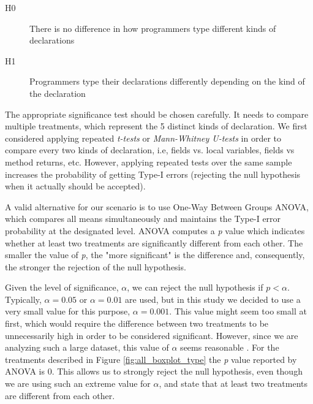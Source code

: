 \documentclass[msc]{ppgccufmg}
\begin{document}
\begin{description}
\item[H0] There is no difference in how programmers type different kinds of declarations
\item[H1] Programmers type their declarations differently depending on the kind of the declaration
\end{description}

The appropriate significance test should be chosen carefully.
It needs to compare multiple treatments, which represent the 5 distinct kinds of declaration.
We first considered applying repeated \emph{t-tests} or \emph{Mann-Whitney U-tests} in order to compare every two kinds of declaration, i.e, fields vs. local variables, fields vs method returns, etc.
However, applying repeated tests over the same sample increases the probability of getting Type-I errors (rejecting the null hypothesis when it actually should be accepted).

A valid alternative for our scenario is to use One-Way Between Groups ANOVA, which compares all means simultaneously and maintains the Type-I error probability at the designated level.
ANOVA computes a \emph{p} value which indicates whether at least two treatments are significantly different from each other.
The smaller the value of \emph{p}, the "more significant" is the difference and, consequently, the stronger the rejection of the null hypothesis.

Given the level of significance, $\alpha$, we can reject the null hypothesis if $p < \alpha$.
Typically, $\alpha=0.05$ or $\alpha=0.01$ are used, but in this study  we decided to use a very small value for this purpose, $\alpha=0.001$.
This value might seem too small at first, which would require the difference between two treatments to be unnecessarily high in order to be considered significant.
However, since we are analyzing such a large dataset, this value of $\alpha$ seems reasonable \cite{labovitz68}.
For the treatments described in Figure \ref{fig:all_boxplot_type} the \emph{p} value reported by ANOVA is 0. 
This allows us to strongly reject the null hypothesis, even though we are using such an extreme value for $\alpha$, and state that at least two treatments are different from each other.

\end{document}
